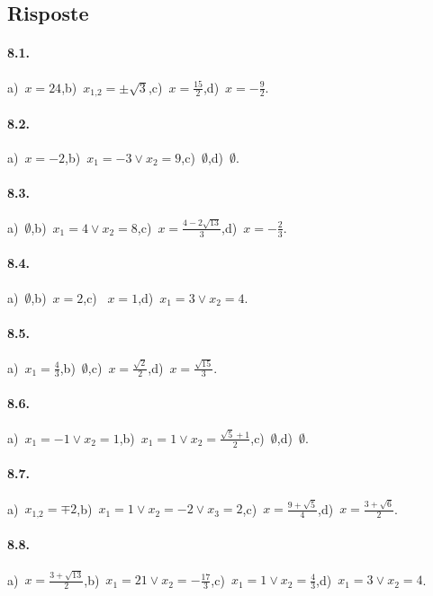 \subsection{Risposte}
\paragraph{8.1.} a)~$x=24$,\quad b)~$x_{1\text{,}2}=\pm \sqrt 3$,\quad c)~$x=\frac{15} 2$,\quad d)~$x=-\frac 9 2$.

\paragraph{8.2.} a)~$x=-2$,\quad b)~$x_1=-3\vee x_2=9$,\quad c)~$\emptyset $,\quad d)~$\emptyset$.

\paragraph{8.3.} a)~$\emptyset$,\quad b)~$x_1=4\vee x_2=8$,\quad c)~$x=\frac{4-2\sqrt{13}} 3$,\quad d)~$x=-\frac 2 3$.

\paragraph{8.4.} a)~$\emptyset$,\quad b)~$x=2$,\quad c)~ $x=1$,\quad d)~$x_1=3\vee x_2=4$.

\paragraph{8.5.} a)~$x_1=\frac 4 3$,\quad b)~$\emptyset$,\quad c)~$x=\frac{\sqrt 2} 2$,\quad d)~$x=\frac{\sqrt{15}} 3$.

\paragraph{8.6.} a)~$x_1=-1\vee x_2=1$,\quad b)~$x_1=1\vee x_2=\frac{\sqrt 5+1} 2$,\quad c)~$\emptyset$,\quad d)~$\emptyset$.

\paragraph{8.7.} a)~$x_{1\text{,}2}=\mp 2$,\quad b)~$x_1=1\vee x_2=-2\vee x_3=2$,\quad c)~$x=\frac{9+\sqrt 5} 4$,\quad d)~$x=\frac{3+\sqrt 6} 2$.

\paragraph{8.8.} a)~$x=\frac{3+\sqrt{13}} 2$,\quad b)~$x_1=21\vee x_2=-\frac{17} 3$,\quad c)~$x_1=1\vee x_2=\frac 4 3$,\quad d)~$x_1=3\vee x_2=4$.

